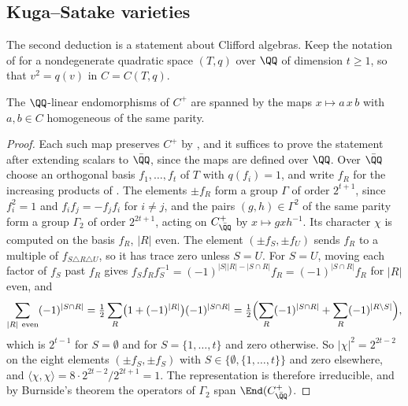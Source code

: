 \subsection{Kuga--Satake varieties}\label{ssec:kspowers}

The second deduction is a statement about Clifford algebras. Keep the
notation of  for a nondegenerate quadratic space $(T,q)$
over $\QQ$ of dimension $t\ge1$, so that $v^{2}=q(v)$ in $C=C(T,q)$.

\begin{lemma}\label{lem:cliffordspan}
The $\QQ$-linear endomorphisms of $C^{+}$ are spanned by the maps
$x\mapsto a\,x\,b$ with $a,b\in C$ homogeneous of the same parity.
\end{lemma}

\begin{proof}
Each such map preserves $C^{+}$ by , and it suffices to
prove the statement after extending scalars to $\bar{\QQ}$, since the maps
are defined over $\QQ$. Over $\bar{\QQ}$ choose an orthogonal basis
$f_{1},\dots,f_{t}$ of $T$ with $q(f_{i})=1$, and write $f_{R}$ for the
increasing products of . The elements $\pm f_{R}$ form a
group $\Gamma$ of order $2^{t+1}$, since $f_{i}^{2}=1$ and
$f_{i}f_{j}=-f_{j}f_{i}$ for $i\ne j$, and the pairs $(g,h)\in\Gamma^{2}$ of
the same parity form a group $\Gamma_{2}$ of order $2^{2t+1}$, acting on
$C^{+}_{\bar{\QQ}}$ by $x\mapsto gxh^{-1}$. Its character $\chi$ is
computed on the basis $f_{R}$, $|R|$ even. The element
$(\pm f_{S},\pm f_{U})$ sends $f_{R}$ to a multiple of
$f_{S\triangle R\triangle U}$, so it has trace zero unless $S=U$. For $S=U$,
moving each factor of $f_{S}$ past $f_{R}$ gives
$f_{S}f_{R}f_{S}^{-1}=(-1)^{|S||R|-|S\cap R|}f_{R}=(-1)^{|S\cap R|}f_{R}$ for
$|R|$ even, and
\[
  \sum_{|R|\ \mathrm{even}}(-1)^{|S\cap R|}
  =\tfrac12\sum_{R}\bigl(1+(-1)^{|R|}\bigr)(-1)^{|S\cap R|}
  =\tfrac12\Bigl(\sum_{R}(-1)^{|S\cap R|}+\sum_{R}(-1)^{|R\setminus S|}\Bigr),
\]
which is $2^{t-1}$ for $S=\emptyset$ and for $S=\{1,\dots,t\}$ and zero
otherwise. So $|\chi|^{2}=2^{2t-2}$ on the eight elements
$(\pm f_{S},\pm f_{S})$ with $S\in\{\emptyset,\{1,\dots,t\}\}$ and zero
elsewhere, and
$\langle\chi,\chi\rangle=8\cdot2^{2t-2}/2^{2t+1}=1$. The representation is
therefore irreducible, and by Burnside's theorem the operators of
$\Gamma_{2}$ span $\End(C^{+}_{\bar{\QQ}})$.
\end{proof}


